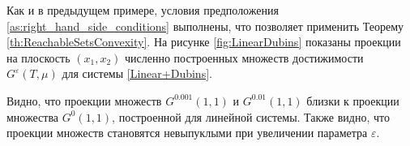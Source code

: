 \documentclass[../main.tex]{subfiles}
\begin{document}
\begin{pr}
	Как и в предыдущем примере, условия предположения \ref{as:right_hand_side_conditions} выполнены, что позволяет применить Теорему \ref{th:ReachableSetsConvexity}. 
	На рисунке \ref{fig:LinearDubins} показаны проекции на плоскость $(x_1,x_2)$ численно построенных множеств достижимости $G^{\varepsilon}(T,\mu)$ для системы \eqref{Linear+Dubins}. 
	
	Видно, что проекции множеств $G^{0.001}(1,1) $ и $G^{0.01}(1,1) $ близки к проекции множества $G^{0}(1,1) $, построенной для линейной системы. 
	Также видно, что проекции множеств становятся невыпуклыми при увеличении параметра $\varepsilon$. 
\end{pr}  %
\end{document}
